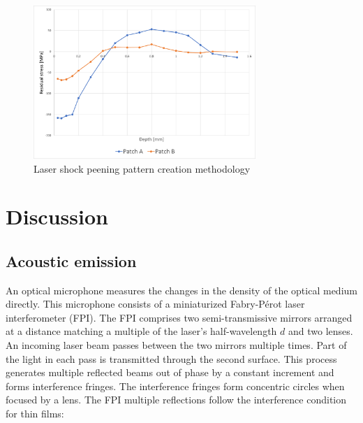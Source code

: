 \documentclass[sn-nature]{sn-jnl}%
\theoremstyle{thmstyleone}%
\theoremstyle{thmstyletwo}%
\theoremstyle{thmstylethree}%
\begin{document}

    \begin{figure}[h!]     
    \centering
    \includegraphics[width=0.75\textwidth]{residual_stress_depth.png}
    \caption{Laser shock peening pattern creation methodology}
    \label{fig:residual_stress}
    \end{figure}

    



\section{Discussion}\label{sec:results}

    \subsection{Acoustic emission}

    An optical microphone measures the changes in the density of the optical medium directly. This microphone consists of a miniaturized Fabry-Pérot laser interferometer (FPI). The FPI comprises two semi-transmissive mirrors arranged at a distance matching a multiple of the laser’s half-wavelength $d$ and two lenses.
    An incoming laser beam passes between the two mirrors multiple times. Part of the light in each pass is transmitted through the second surface. This process generates multiple reflected beams out of phase by a constant increment and forms interference fringes. The interference fringes form concentric circles when focused by a lens. The FPI multiple reflections follow the interference condition for thin films:
\end{document}
